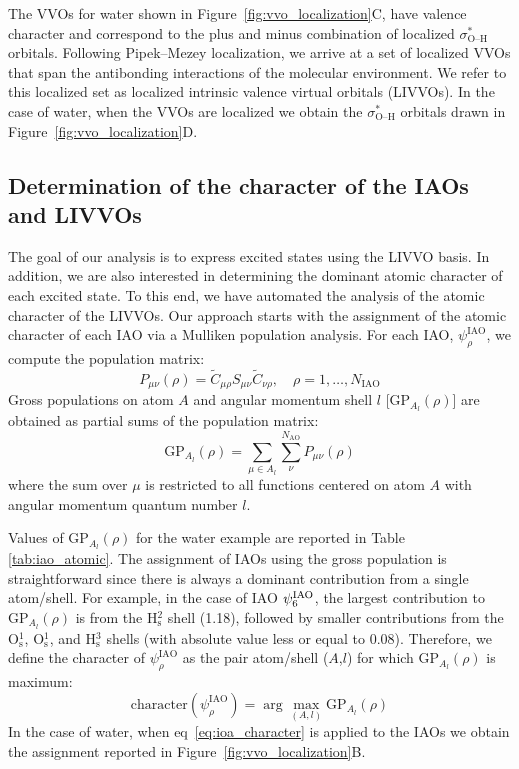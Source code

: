 \documentclass{article}
\begin{document}
The VVOs for water shown in Figure~\ref{fig:vvo_localization}C, have valence character and correspond to the plus and minus combination of localized $\sigma^*_\text{O--H}$ orbitals.
Following Pipek--Mezey localization,\cite{pipek_fast_1989} we arrive at a set of localized VVOs that span the antibonding interactions of the molecular environment. We refer to this localized set as localized intrinsic valence virtual orbitals (LIVVOs). In the case of water, when the VVOs are localized we obtain the $\sigma^*_\text{O--H}$ orbitals drawn in Figure~\ref{fig:vvo_localization}D.

\subsection{Determination of the character of the IAOs and LIVVOs}
The goal of our analysis is to express excited states using the LIVVO basis. In addition, we are also interested in determining the dominant atomic character of each excited state.
To this end, we have automated the analysis of the atomic character of the LIVVOs.
Our approach starts with the assignment of the atomic character of each IAO via a Mulliken population analysis.\cite{mulliken_electronic_1955,mulliken_electronic_1955-1}
For each IAO, $\psi_{\rho}^\mathrm{IAO}$, we compute the population matrix:
\begin{equation}
P_{\mu\nu}(\rho) = \tilde{C}_{\mu \rho} S_{\mu\nu} \tilde{C}_{\nu \rho}, \quad \rho = 1, \ldots, N_\mathrm{IAO}
\end{equation}
Gross populations on atom $A$ and angular momentum shell $l$ [GP$_{A_l}(\rho)$] are obtained as partial sums of the population matrix:
\begin{equation}
\mathrm{GP}_{A_{l}}(\rho)  = \sum_{\mu \in A_{l}} \sum_{\nu}^{N_\mathrm{AO}} P_{\mu\nu}(\rho) 
\end{equation}
where the sum over $\mu$ is restricted to all functions centered on atom $A$ with angular momentum quantum number  ${l}$.

Values of $\mathrm{GP}_{A_{l}}(\rho)$ for the water example are reported in Table \ref{tab:iao_atomic}.
The assignment of IAOs using the gross population is straightforward since there is always a dominant contribution from a single atom/shell.
For example, in the case of IAO $\psi^{\rm IAO}_6$, the largest contribution to $\mathrm{GP}_{A_{l}}(\rho)$ is from the H$_\mathrm{s}^2$ shell (1.18), followed by smaller contributions from the O$_\mathrm{s}^1$, O$_\mathrm{s}^1$, and H$_\mathrm{s}^3$ shells (with absolute value less or equal to 0.08).
Therefore, we define the character of $\psi_{\rho}^\mathrm{IAO}$ as the pair atom/shell ($A$,${l}$) for which $\mathrm{GP}_{A_{l}}(\rho)$ is maximum:
\begin{equation}
 \mathrm{character}(\psi_{\rho}^\mathrm{IAO}) = \arg\max_{(A,{l})} \mathrm{GP}_{A_{l}}(\rho) \label{eq:ioa_character}
\end{equation}
In the case of water, when eq~\eqref{eq:ioa_character} is applied to the IAOs we obtain the assignment reported in Figure~\ref{fig:vvo_localization}B.
\end{document}
